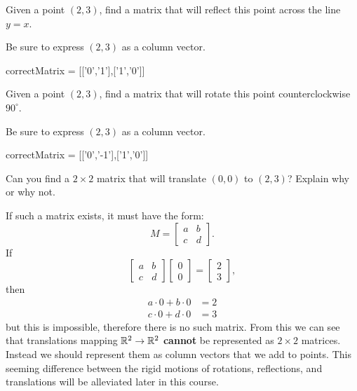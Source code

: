 \documentclass[handout]{ximera}
\begin{document}
\begin{question}
Given a point $(2,3)$, find a matrix that will reflect this point
across the line $y=x$.
\begin{solution}
  \begin{hint}
    Be sure to express $(2,3)$ as a column vector.
  \end{hint}
  \begin{matrixAnswer}[name=M]
    correctMatrix = [['0','1'],['1','0']]
\end{matrixAnswer}
\end{solution}
Given a point $(2,3)$, find a matrix that will rotate this point
counterclockwise $90^\circ$.
\begin{solution}
  \begin{hint}
    Be sure to express $(2,3)$ as a column vector.
  \end{hint}
  \begin{matrixAnswer}[name=M]
    correctMatrix = [['0','-1'],['1','0']]
\end{matrixAnswer}
\end{solution}
Can you find a $2\times 2$ matrix that will translate $(0,0)$ to
$(2,3)$? Explain why or why not.
\begin{solution}
\begin{freeResponse}
If such a matrix exists, it must have the form:
\[
M = 
\begin{bmatrix}
a & b \\
c & d
\end{bmatrix}.
\]
If 
\[
\begin{bmatrix}
a & b \\
c & d
\end{bmatrix}
\begin{bmatrix}
0 \\
0 
\end{bmatrix} = 
\begin{bmatrix}
2 \\
3
\end{bmatrix},
\]
then 
\begin{align*}
a\cdot 0 + b\cdot 0 &= 2\\
c\cdot 0 + d\cdot 0 &= 3
\end{align*}
but this is impossible, therefore there is no such matrix. From this
we can see that translations mapping $\mathbb R^2\to \mathbb R^2$ \textbf{cannot} be
represented as $2\times 2$ matrices. Instead we should represent them
as column vectors that we add to points. This seeming difference
between the rigid motions of rotations, reflections, and translations
will be alleviated later in this course.
\end{freeResponse}
\end{solution}
\end{question}
\end{document}
